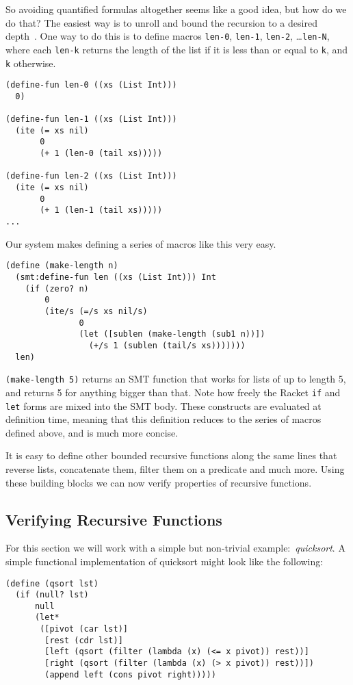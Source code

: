 So avoiding quantified formulas altogether seems like a good idea, but how do
we do that? The easiest way is to unroll and bound the recursion to a desired
depth~\cite{sat-recursive}. One way to do this is to define macros
\texttt{len-0}, \texttt{len-1}, \texttt{len-2}, \ldots \texttt{len-N}, where
each \texttt{len-k} returns the length of the list if it is less than or equal
to \texttt{k}, and \texttt{k} otherwise.

\begin{verbatim}
(define-fun len-0 ((xs (List Int)))
  0)

(define-fun len-1 ((xs (List Int)))
  (ite (= xs nil)
       0
       (+ 1 (len-0 (tail xs)))))

(define-fun len-2 ((xs (List Int)))
  (ite (= xs nil)
       0
       (+ 1 (len-1 (tail xs)))))
...
\end{verbatim}

Our system makes defining a series of macros like this very easy.

\begin{verbatim}
(define (make-length n)
  (smt:define-fun len ((xs (List Int))) Int
    (if (zero? n)
        0
        (ite/s (=/s xs nil/s)
               0
               (let ([sublen (make-length (sub1 n))])
                 (+/s 1 (sublen (tail/s xs)))))))
  len)
\end{verbatim}

\texttt{(make-length 5)} returns an SMT function that works for lists of up to
length 5, and returns 5 for anything bigger than that. Note how freely the
Racket \texttt{if} and \texttt{let} forms are mixed into the SMT body. These
constructs are evaluated at definition time, meaning that this definition
reduces to the series of macros defined above, and is much more concise.

It is easy to define other bounded recursive functions along the same lines
that reverse lists, concatenate them, filter them on a predicate and much
more. Using these building blocks we can now verify properties of recursive
functions.

\subsection{Verifying Recursive Functions}

For this section we will work with a simple but non-trivial
example:~\textit{quicksort}. A simple functional implementation of quicksort
might look like the following:

\begin{verbatim}
(define (qsort lst)
  (if (null? lst)
      null
      (let*
       ([pivot (car lst)]
        [rest (cdr lst)]
        [left (qsort (filter (lambda (x) (<= x pivot)) rest))]
        [right (qsort (filter (lambda (x) (> x pivot)) rest))])
        (append left (cons pivot right)))))
\end{verbatim}

